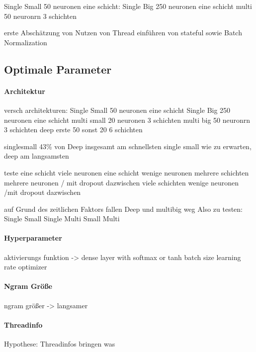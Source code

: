            Single Small 50 neuronen eine schicht:
            Single Big 250 neuronen eine schicht
            multi 50 neuronrn 3 schichten

        erste Abschätzung von Nutzen von Thread 
        einführen von stateful sowie Batch Normalization

    \subsection{Optimale Parameter}
        \paragraph{Architektur}
            versch architekturen:
            Single Small 50 neuronen eine schicht
            Single Big 250 neuronen eine schicht
            multi small 20 neuronen 3 schichten
            multi big 50 neuronrn 3 schichten
            deep erste 50 sonst 20 6 schichten

            singlesmall 43\% von Deep
            insgesamt am schnellsten single small
            wie zu erwarten,  deep am langsamsten

            teste eine schicht viele neuronen 
            eine schicht wenige neuronen
            mehrere schichten mehrere neuronen / mit dropout dazwischen
            viele schichten wenige neuronen /mit dropout dazwischen

            auf Grund des zeitlichen Faktors fallen Deep und multibig weg
            Also zu testen:
            Single Small
            Single 
            Multi Small
            Multi 

        \paragraph{Hyperparameter}
            aktivierungs funktion
            -> dense layer with softmax or tanh
            batch size
            learning rate
            optimizer

        \paragraph{Ngram Größe}
            ngram größer -> langsamer

        \paragraph{Threadinfo}
            Hypothese:
            Threadinfos bringen was

